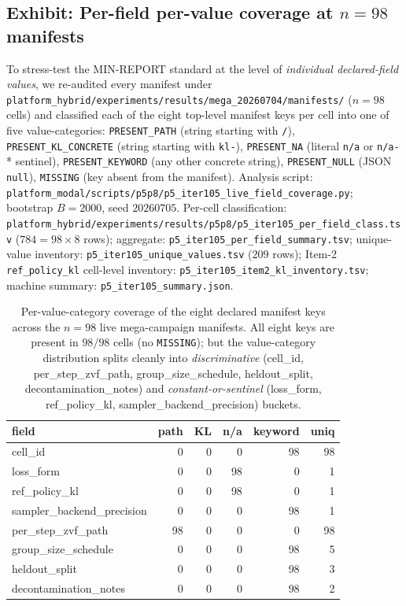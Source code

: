 \subsection{Exhibit: Per-field per-value coverage at \texorpdfstring{$n{=}98$}{n=98} manifests}
\label{sec:p5-iter105-coverage}

To stress-test the MIN-REPORT standard at the level of \emph{individual
declared-field values}, we re-audited every manifest under
\texttt{platform_hybrid/experiments/results/mega\_20260704/manifests/} ($n{=}98$ cells)
and classified each of the eight top-level manifest keys per cell into
one of five value-categories: \texttt{PRESENT\_PATH} (string starting with
\texttt{/}), \texttt{PRESENT\_KL\_CONCRETE} (string starting with
\texttt{kl-}), \texttt{PRESENT\_NA} (literal \texttt{n/a} or
\texttt{n/a-}* sentinel), \texttt{PRESENT\_KEYWORD} (any other concrete
string), \texttt{PRESENT\_NULL} (JSON \texttt{null}), \texttt{MISSING}
(key absent from the manifest). Analysis script:
\texttt{platform_modal/scripts/p5p8/p5\_iter105\_live\_field\_coverage.py}; bootstrap
$B{=}2000$, seed $20260705$. Per-cell classification:
\texttt{platform_hybrid/experiments/results/p5p8/p5\_iter105\_per\_field\_class.tsv}
($784{=}98{\times}8$ rows); aggregate:
\texttt{p5\_iter105\_per\_field\_summary.tsv}; unique-value inventory:
\texttt{p5\_iter105\_unique\_values.tsv} ($209$ rows); Item-2
\texttt{ref\_policy\_kl} cell-level inventory:
\texttt{p5\_iter105\_item2\_kl\_inventory.tsv}; machine summary:
\texttt{p5\_iter105\_summary.json}.

\begin{table}[t]
\centering
\caption{Per-value-category coverage of the eight declared manifest keys
across the $n{=}98$ live mega-campaign manifests. All eight keys are
present in $98/98$ cells (no \texttt{MISSING}); but the value-category
distribution splits cleanly into \emph{discriminative} (cell_id,
per\_step\_zvf\_path, group\_size\_schedule, heldout\_split,
decontamination\_notes) and \emph{constant-or-sentinel} (loss\_form,
ref\_policy\_kl, sampler\_backend\_precision) buckets.}
\label{tab:p5-iter105-coverage}
\small
\begin{tabular}{@{}lrrrrr@{}}
\toprule
field & path & KL & n/a & keyword & uniq \\
\midrule
cell\_id                     &   0 &   0 &  0 &  98 &  98 \\
loss\_form                   &   0 &   0 & 98 &   0 &   1 \\
ref\_policy\_kl               &   0 &   0 & 98 &   0 &   1 \\
sampler\_backend\_precision   &   0 &   0 &  0 &  98 &   1 \\
per\_step\_zvf\_path          &  98 &   0 &  0 &   0 &  98 \\
group\_size\_schedule         &   0 &   0 &  0 &  98 &   5 \\
heldout\_split               &   0 &   0 &  0 &  98 &   3 \\
decontamination\_notes       &   0 &   0 &  0 &  98 &   2 \\
\bottomrule
\end{tabular}
\end{table}

